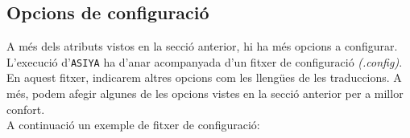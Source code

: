 \documentclass[11pt,a4paper]{article}
\begin{document}
\subsection{Opcions de configuració}
A més dels atributs vistos en la secció anterior, hi ha més opcions a configurar. L'execució d'\texttt{ASIYA} ha d'anar acompanyada d'un fitxer de configuració \textit{(.config)}. En aquest fitxer, indicarem altres opcions com les llengües de les traduccions. A més, podem afegir algunes de les opcions vistes en la secció anterior per a millor confort.
\\

A continuació un exemple de fitxer de configuració:
\begin{table}[H]
\end{table}
\end{document}
